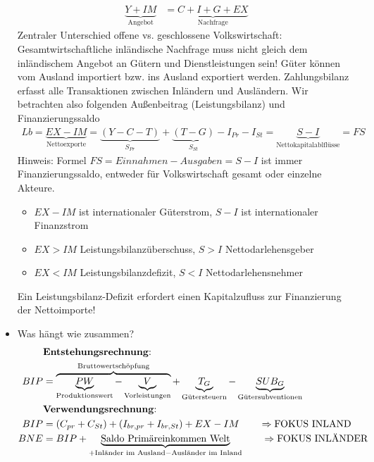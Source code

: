 \documentclass{scrartcl}
\begin{document}
\begin{itemize}
\begin{align*}
      \underbrace{Y+IM}_\text{Angebot} &= \underbrace{C+I+G+EX}_\text{Nachfrage}
    \end{align*}
    Zentraler Unterschied offene vs. geschlossene Volkswirtschaft:\\
    Gesamtwirtschaftliche inl\"{a}ndische Nachfrage muss nicht gleich dem inl\"{a}ndischem Angebot an G\"{u}tern und Dienstleistungen sein! G\"{u}ter k\"{o}nnen vom Ausland importiert bzw. ins Ausland exportiert werden. Zahlungsbilanz erfasst alle Transaktionen zwischen Inl\"{a}ndern und Ausl\"{a}ndern. Wir betrachten also folgenden Au{\ss}enbeitrag (Leistungsbilanz) und Finanzierungssaldo
    \begin{align*}
      Lb = \underbrace{EX-IM}_\text{Nettoexporte} = \underbrace{(Y - C - T)}_{S_{Pr}} + \underbrace{(T-G)}_{S_{St}} - I_{Pr} - I_{St}= \underbrace{S-I}_\text{Nettokapitalablfl\"{u}sse} =FS
    \end{align*}
    Hinweis: Formel $FS=Einnahmen-Ausgaben=S-I$ ist immer Finanzierungssaldo, entweder f\"{u}r Volkswirtschaft gesamt oder einzelne Akteure.
    \begin{itemize}
      \item $EX-IM$ ist internationaler G\"{u}terstrom, $S-I$ ist internationaler Finanzstrom
      \item $EX>IM$ Leistungsbilanz\"{u}berschuss, $S>I$ Nettodarlehensgeber
      \item $EX<IM$ Leistungsbilanzdefizit, $S<I$ Nettodarlehensnehmer
    \end{itemize}
    Ein Leistungsbilanz-Defizit erfordert einen Kapitalzufluss zur Finanzierung der Nettoimporte!
\item Was h\"{a}ngt wie zusammen?
    \begin{align*}
    &\text{\textbf{Entstehungsrechnung}:}\\
      BIP&= \overbrace{\underbrace{PW}_\text{Produktionswert} - \underbrace{V}_\text{Vorleistungen}}^\text{Bruttowertsch\"{o}pfung} + \underbrace{T_G}_\text{G\"{u}tersteuern} - \underbrace{SUB_G}_\text{G\"{u}tersubventionen} \\
    &\text{\textbf{Verwendungsrechnung}:}\\
      BIP &= (C_{pr} + C_{St}) + (I_{br,pr}+I_{br,St}) + EX-IM \qquad \Rightarrow \text{FOKUS INLAND}\\
      BNE &= BIP +  \underbrace{\text{Saldo Prim\"{a}reinkommen Welt}}_{+\text{Inl\"{a}nder im Ausland}-\text{Ausl\"{a}nder im Inland}} \qquad \Rightarrow \text{FOKUS INL\"{A}NDER}\\

\end{align*}
\end{itemize}
\end{document}
